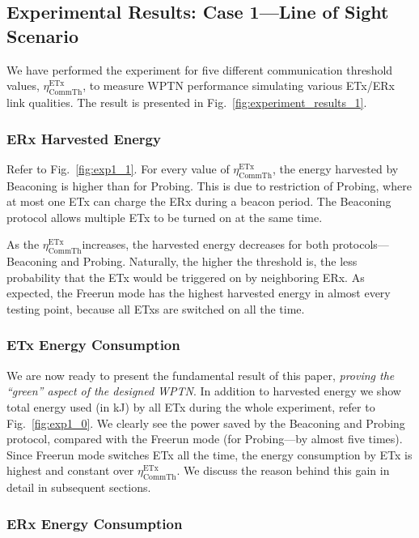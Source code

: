 \documentclass[11pt,draftclsnofoot,journal,onecolumn]{IEEEtran}
\newcommand{\txRssiThreshold}{$\eta^\text{ETx}_\text{CommTh}$}
\begin{document}
\subsection{Experimental Results: Case 1---Line of Sight Scenario}
\label{sec:LOS_experiment}

We have performed the experiment for five different communication threshold values, \txRssiThreshold, to measure WPTN performance simulating various ETx/ERx link qualities. The result is presented in Fig.~\ref{fig:experiment_results_1}.

\subsubsection{ERx Harvested Energy}

Refer to Fig.~\ref{fig:exp1_1}. For every value of \txRssiThreshold, the energy harvested by Beaconing is higher than for Probing. This is due to restriction of Probing, where at most one ETx can charge the ERx during a beacon period. The Beaconing protocol allows multiple ETx to be turned on at the same time.

As the \txRssiThreshold increases, the harvested energy decreases for both protocols---Beaconing and Probing. Naturally, the higher the threshold is, the less probability that the ETx would be triggered on by neighboring ERx. As expected, the Freerun mode has the highest harvested energy in almost every testing point, because all ETxs are switched on all the time.

\subsubsection{ETx Energy Consumption}

We are now ready to present the fundamental result of this paper, \emph{proving the ``green'' aspect of the designed WPTN}. In addition to harvested energy we show total energy used (in kJ) by all ETx during the whole experiment, refer to Fig.~\ref{fig:exp1_0}. We clearly see the power saved by the Beaconing and Probing protocol, compared with the Freerun mode (for Probing---by almost five times). Since Freerun mode switches ETx all the time, the energy consumption by ETx is highest and constant over \txRssiThreshold. We discuss the reason behind this gain in detail in subsequent sections.

\subsubsection{ERx Energy Consumption}
\end{document}

